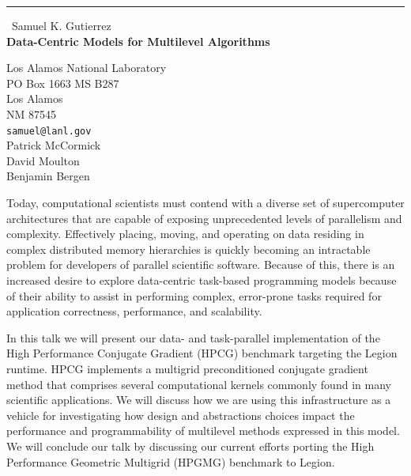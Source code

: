 \documentclass{report}
\begin{document}
\begin{center}
\rule{6in}{1pt} \
{\large Samuel K. Gutierrez \\
{\bf Data-Centric Models for Multilevel Algorithms}}

Los Alamos National Laboratory \\ PO Box 1663 MS B287 \\ Los Alamos \\ NM 87545
\\
{\tt samuel@lanl.gov}\\
Patrick McCormick\\
David Moulton\\
Benjamin Bergen\end{center}

Today, computational scientists must contend with a diverse set of
supercomputer architectures that are capable of exposing unprecedented
levels of parallelism and complexity. Effectively placing, moving, and
operating on data residing in complex distributed memory hierarchies is
quickly becoming an intractable problem for developers of parallel
scientific software. Because of this, there is an increased desire to
explore data-centric task-based programming models because of their
ability to assist in performing complex, error-prone tasks required for
application correctness, performance, and scalability.

In this talk we will present our data- and task-parallel implementation
of the High Performance Conjugate Gradient (HPCG) benchmark targeting the
Legion runtime. HPCG implements a multigrid preconditioned conjugate
gradient method that comprises several computational kernels commonly
found in many scientific applications. We will discuss how we are using
this infrastructure as a vehicle for investigating how design and
abstractions choices impact the performance and programmability of
multilevel methods expressed in this model. We will conclude our talk by
discussing our current efforts porting the High Performance Geometric
Multigrid (HPGMG) benchmark to Legion.
\end{document}
